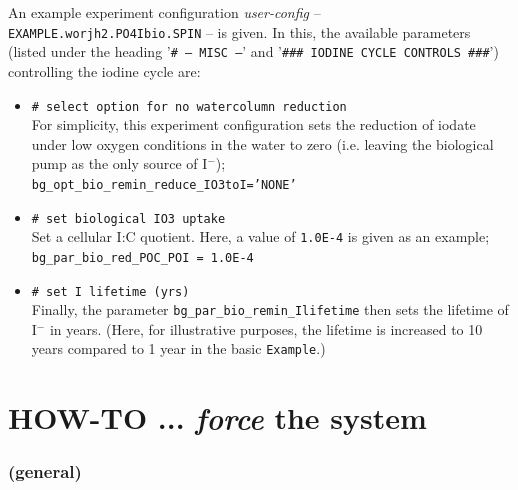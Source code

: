 \documentclass[11pt,fleqn]{book} %
\begin{document}
An example experiment configuration \textit{user-config} -- \texttt{EXAMPLE.worjh2.PO4Ibio.SPIN} -- is given. In this, the available parameters (listed under the heading '\texttt{\# --- MISC ---}' and '\texttt{\#\#\# IODINE CYCLE CONTROLS \#\#\#}') controlling the iodine cycle are:

\begin{itemize}[noitemsep]

\vspace{1mm}
        \item \texttt{\# select option for no watercolumn reduction}
        \\ For simplicity, this experiment configuration sets the reduction of iodate under low oxygen conditions in the water to zero (i.e. leaving the biological pump as the only source of I\(^{-}\));
\\ \texttt{bg\_opt\_bio\_remin\_reduce\_IO3toI='NONE'}

\vspace{1mm}
        \item \texttt{\# set biological IO3 uptake}
        \\ Set a cellular I:C quotient. Here, a value of \texttt{1.0E-4} is given as an example;
\\ \texttt{bg\_par\_bio\_red\_POC\_POI = 1.0E-4}

\vspace{1mm}
        \item \texttt{\# set I lifetime (yrs)}
        \\ Finally, the parameter \texttt{bg\_par\_bio\_remin\_Ilifetime} then sets the lifetime of I\(^{-}\) in years. (Here, for illustrative purposes, the lifetime is increased to 10 years compared to 1 year in the basic \texttt{Example}.)

\end{itemize}
\vspace{1mm}


\newpage


\section{HOW-TO ...  \textit{force} the system}

%
\subsubsection{(general)}
\vspace{1mm}
\end{document}
